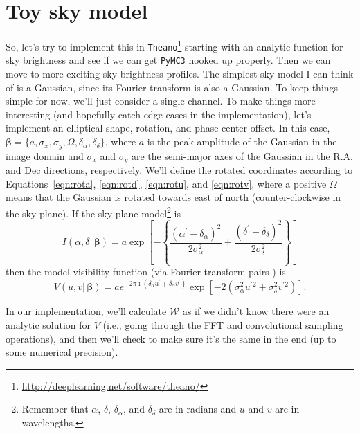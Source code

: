\documentclass[modern]{aastex62}
\newcommand{\vm}{\boldsymbol{\mathcal{W}}} %
\newcommand{\bbeta}{\boldsymbol{\beta}} %
\begin{document}
\section{Toy sky model}
So, let's try to implement this in \texttt{Theano}\footnote{\url{http://deeplearning.net/software/theano/}} starting with an analytic function for sky brightness and see if we can get \texttt{PyMC3} hooked up properly. Then we can move to more exciting sky brightness profiles. The simplest sky model I can think of is a Gaussian, since its Fourier transform is also a Gaussian. To keep things simple for now, we'll just consider a single channel. To make things more interesting (and hopefully catch edge-cases in the implementation), let's implement an elliptical shape, rotation, and phase-center offset. In this case, $\bbeta = \{a, \sigma_x, \sigma_y, \Omega, \delta_\alpha, \delta_\delta \}$, where $a$ is the peak amplitude of the Gaussian in the image domain and $\sigma_x$ and $\sigma_y$ are the semi-major axes of the Gaussian in the R.A. and Dec directions, respectively. We'll define the rotated coordinates according to Equations~\ref{eqn:rota}, \ref{eqn:rotd}, \ref{eqn:rotu}, and \ref{eqn:rotv}, where a positive $\Omega$ means that the Gaussian is rotated towards east of north (counter-clockwise in the sky plane). If the sky-plane model\footnote{Remember that $\alpha$, $\delta$, $\delta_\alpha$, and $\delta_\delta$ are in radians and $u$ and $v$ are in wavelengths.} is
\begin{equation}
    I(\alpha, \delta |\, \bbeta) = a \exp \left [ - \left \{  \frac{(\alpha^\prime - \delta_\alpha)^2}{2 \sigma_\alpha^2} + \frac{(\delta^\prime - \delta_\delta)^2}{2 \sigma_\delta^2} \right \} \right ]
\end{equation}
then the model visibility function (via Fourier transform pairs \citep[e.g., ch. 16,][]{bracewell00}) is
\begin{equation}
    V(u, v |\, \bbeta) = a e^{- 2 \pi \imath (\delta_\alpha u^\prime + \delta_\alpha v^\prime)} \exp \left [ -2 (\sigma_\alpha^2 u^{\prime 2} + \sigma_\delta^2 v^{\prime 2}) \right ].
\end{equation}

In our implementation, we'll calculate $\vm$ as if we didn't know there were an analytic solution for $V$ (i.e., going through the FFT and convolutional sampling operations), and then we'll check to make sure it's the same in the end (up to some numerical precision).



\end{document}
